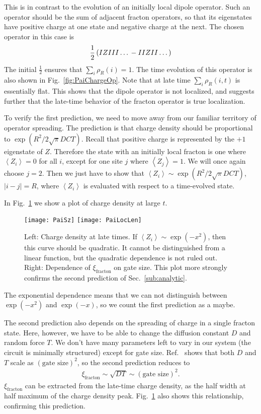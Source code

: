 \documentclass[a4paper,12pt]{article}
\renewcommand{\th}[1]{\frac{1}{#1}}
\newcommand{\ex}[1]{\left\langle #1 \right\rangle}
\newcommand{\note}[1]{{\color{red}{#1}}}
\begin{document}
This is in contrast to the evolution of an initially local dipole operator. Such an operator should be the sum of adjacent fracton operators, so that its eigenstates have positive charge at one state and negative charge at the next. The chosen operator in this case is 
\begin{align}
\th{2}\left(IZIII\dots \vphantom{j}-IIZII\dots\right)
\end{align}
\note{Shouldn't it be $\th{\sqrt{2}}$?} The initial $\th{2}$ ensures that $\sum_i\rho_R(i)=1$. The time evolution of this operator is also shown in Fig.~\ref{fig:PaiChargeOp}. Note that at late time $\sum_i\rho_R(i, t)$ is essentially flat. This shows that the dipole operator is not localized, and suggests further that the late-time behavior of the fracton operator is true localization. 

To verify the first prediction, we need to move away from our familiar territory of operator spreading. The prediction is that charge density should be proportional to $\exp(R^2/2\sqrt{\pi}DCT)$. Recall that positive charge is represented by the $+1$ eigenstate of $Z$. Therefore the state with an initially local fracton is one where $\ex{Z_i}=0$ for all $i$, except for one site $j$ where $\ex{Z_j}=1$. We will once again choose $j=2$. Then we just have to show that $\ex{Z_i}\sim\exp(R^2/2\sqrt{\pi}DCT)$, $|i-j|=R$, where $\ex{Z_i}$ is evaluated with respect to a time-evolved state.

In Fig.~\ref{fig:PaiSz} we show a plot of charge density at large $t$. 
\begin{figure}
	\centering
	\texttt{[image: PaiSz]}
	\texttt{[image: PaiLocLen]}
	\caption{Left: Charge density at late times. If $\ex{Z_i}\sim\exp(-x^2)$, then this curve should be quadratic. It cannot be distinguished from a linear function, but the quadratic dependence is not ruled out. Right: Dependence of $\xi_\text{fracton}$ on gate size. This plot more strongly confirms the second prediction of Sec.~\ref{sub:analytic}.}
	\label{fig:PaiSz}
\end{figure}
The exponential dependence means that we can not distinguish between $\exp(-x^2)$ and $\exp(-x)$, so we count the first prediction as a maybe. 

The second prediction also depends on the spreading of charge in a single fracton state. Here, however, we have to be able to change the diffusion constant $D$ and random force $T$. We don't have many parameters left to vary in our system (the circuit is minimally structured) except for gate size. Ref.~\cite{PaiFracton} shows that both $D$ and $T$ scale as $(\text{gate size})^2$, so the second prediction reduces to
\begin{align}
\xi_\text{fracton}\sim\sqrt{DT}\sim(\text{gate size})^2.
\end{align}
$\xi_\text{fracton}$ can be extracted from the late-time charge density, as the half width at half maximum of the charge density peak.
Fig.~\ref{fig:PaiSz} also shows this relationship, confirming this prediction.
\end{document}
